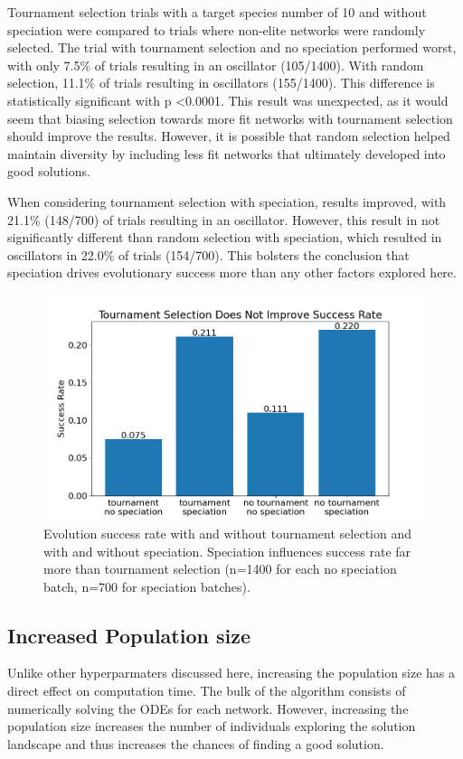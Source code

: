 \documentclass[12pt]{report}
\begin{document}
Tournament selection trials with a target species number of 10 and without speciation were compared to trials where non-elite networks were randomly selected. The trial with tournament selection and no speciation performed worst, with only 7.5\% of trials resulting in an oscillator (105/1400). With random selection, 11.1\% of trials resulting in oscillators (155/1400). This difference is statistically significant with p \textless 0.0001. This result was unexpected, as it would seem that biasing selection towards more fit networks with tournament selection should improve the results. However, it is possible that random selection helped maintain diversity by including less fit networks that ultimately developed into good solutions.

When considering tournament selection with speciation, results improved, with 21.1\% (148/700) of trials resulting in an oscillator. However, this result in not significantly different than random selection with speciation, which resulted in oscillators in 22.0\% of trials (154/700). This bolsters the conclusion that speciation drives evolutionary success more than any other factors explored here.

\begin{figure}
	\centering
    \includegraphics[width=15cm]{images/tournament_speciation.png}
    \caption[Evolutionary success rates with tournament selection and speciation]{Evolution success rate with and without tournament selection and with and without speciation. Speciation influences success rate far more than tournament selection (n=1400 for each no speciation batch, n=700 for speciation batches).}
    \label{fig:tournament_speciation}
\end{figure}

\subsection{Increased Population size}
Unlike other hyperparmaters discussed here, increasing the population size has a direct effect on computation time. The bulk of the algorithm consists of numerically solving the ODEs for each network. However, increasing the population size increases the number of individuals exploring the solution landscape and thus increases the chances of finding a good solution. 
\end{document}
